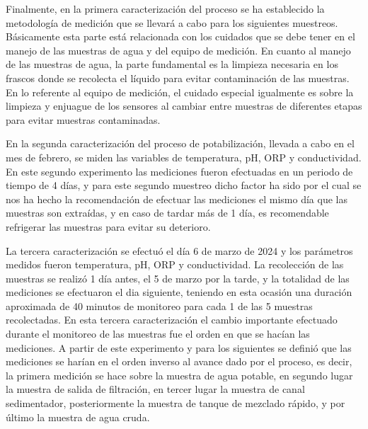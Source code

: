 														   

Finalmente, en la primera caracterización del proceso se ha establecido la metodología de medición que se llevará a cabo para los siguientes muestreos. Básicamente esta parte está relacionada con los cuidados que se debe tener 
en el manejo de las muestras de agua y del equipo de medición. En cuanto al manejo de las muestras de agua, la parte fundamental es la limpieza necesaria en los frascos donde se recolecta el líquido para evitar contaminación 
de las muestras. En lo referente al equipo de medición, el cuidado especial igualmente es sobre la limpieza y enjuague de los sensores al cambiar entre muestras de diferentes etapas para evitar muestras contaminadas. 

En la segunda caracterización del proceso de potabilización, llevada a cabo en el mes de febrero, se miden las variables de temperatura, pH, ORP y conductividad. En este segundo experimento las mediciones fueron efectuadas 
en un periodo de tiempo de 4 días, y para este segundo muestreo dicho factor ha sido por el cual se nos ha hecho la recomendación de efectuar las mediciones el mismo día que las muestras son extraídas, y en caso de tardar 
más de 1 día, es recomendable refrigerar las muestras para evitar su deterioro.

La tercera caracterización se efectuó el día 6 de marzo de 2024 y los parámetros medidos fueron temperatura, pH, ORP y conductividad. La recolección de las muestras 
se realizó 1 día antes, el 5 de marzo por la tarde, y la totalidad de las mediciones se efectuaron el dia siguiente, teniendo en esta ocasión una duración aproximada de 40 minutos 
de monitoreo para cada 1 de las 5 muestras recolectadas. En esta tercera caracterización el cambio importante efectuado durante el monitoreo de las muestras fue el orden en que se hacían las mediciones. A partir de este 
experimento y para los siguientes se definió que las mediciones se harían en el orden inverso al avance dado por el proceso, es decir, la primera medición se hace sobre la muestra de agua potable, en segundo 
lugar la muestra de salida de filtración, en tercer lugar la muestra de canal sedimentador, posteriormente la muestra de tanque de mezclado rápido, y por último la muestra de agua cruda. 

